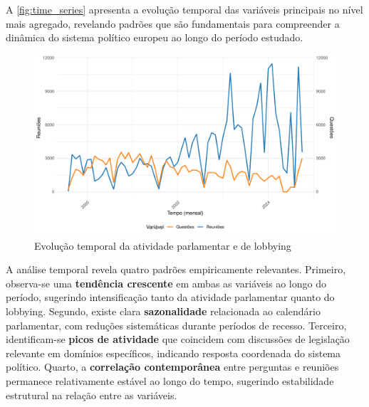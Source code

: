 A \autoref{fig:time_series} apresenta a evolução temporal das variáveis principais no nível mais agregado, revelando padrões que são fundamentais para compreender a dinâmica do sistema político europeu ao longo do período estudado.

\begin{figure}[htbp]
\centering
\includegraphics[width=\textwidth]{figures/fig1_time_series_meetings_questions.pdf}
\caption{Evolução temporal da atividade parlamentar e de lobbying}
\label{fig:time_series}
\end{figure}

A análise temporal revela quatro padrões empiricamente relevantes. Primeiro, observa-se uma \textbf{tendência crescente} em ambas as variáveis ao longo do período, sugerindo intensificação tanto da atividade parlamentar quanto do lobbying. Segundo, existe clara \textbf{sazonalidade} relacionada ao calendário parlamentar, com reduções sistemáticas durante períodos de recesso. Terceiro, identificam-se \textbf{picos de atividade} que coincidem com discussões de legislação relevante em domínios específicos, indicando resposta coordenada do sistema político. Quarto, a \textbf{correlação contemporânea} entre perguntas e reuniões permanece relativamente estável ao longo do tempo, sugerindo estabilidade estrutural na relação entre as variáveis.



